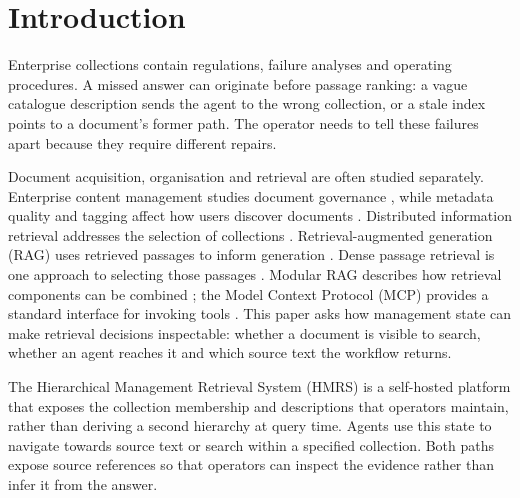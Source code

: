 \section{Introduction}
\label{sec:intro}

Enterprise collections contain regulations, failure analyses and operating
procedures. A missed answer can originate before passage ranking: a vague
catalogue description sends the agent to the wrong collection, or a stale
index points to a document's former path. The operator needs to tell these
failures apart because they require different repairs.

Document acquisition, organisation and retrieval are often studied
separately. Enterprise content management studies document
governance \cite{paivarinta-ecm-2005,tyrvaainen-ecm-2006}, while metadata
quality and tagging affect how users discover documents
\cite{park-metadata-quality-2009,golder-tagging-2006}. Distributed
information retrieval addresses the selection of collections
\cite{callan1995searching,si2003redde}. Retrieval-augmented generation (RAG) uses retrieved passages to inform
generation \cite{rag-lewis,gao-rag-survey-2023}. Dense passage retrieval is
one approach to selecting those passages \cite{dpr}. Modular RAG describes
how retrieval components can be combined \cite{modular-rag}; the Model
Context Protocol (MCP) provides a standard interface for invoking tools
\cite{mcp}. This paper asks how management state can make retrieval
decisions inspectable: whether a document is visible to search, whether an
agent reaches it and which source text the workflow returns.

The Hierarchical Management Retrieval System (HMRS) is a self-hosted
platform that exposes the collection membership and descriptions that
operators maintain, rather than deriving a second hierarchy at query time.
Agents use this state to navigate towards source text or search within a
specified collection. Both paths expose source references so that
operators can inspect the evidence rather than infer it from the answer.

